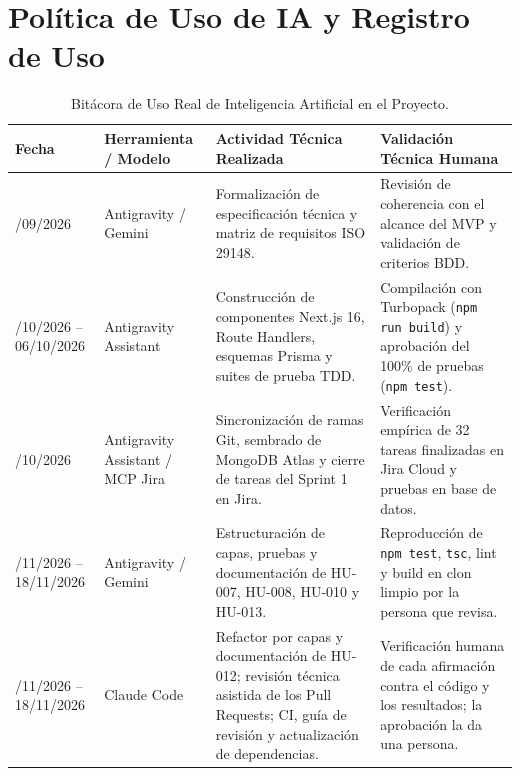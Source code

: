 \documentclass[11pt,a4paper]{article}
\begin{document}
\section{Política de Uso de IA y Registro de Uso}
\begin{table}[H]
\centering
\scriptsize
\renewcommand{\arraystretch}{1.2}
\begin{tabularx}{\linewidth}{|>{\raggedright\arraybackslash}p{2.2cm}|>{\raggedright\arraybackslash}p{3.0cm}|>{\raggedright\arraybackslash}p{4.5cm}|>{\raggedright\arraybackslash}X|}
\hline
\rowcolor{gray!15}
\textbf{Fecha} & \textbf{Herramienta / Modelo} & \textbf{Actividad Técnica Realizada} & \textbf{Validación Técnica Humana} \\
\hline
30/09/2026 & Antigravity / Gemini & Formalización de especificación técnica y matriz de requisitos ISO 29148. & Revisión de coherencia con el alcance del MVP y validación de criterios BDD. \\
\hline
01/10/2026 -- 06/10/2026 & Antigravity Assistant & Construcción de componentes Next.js 16, Route Handlers, esquemas Prisma y suites de prueba TDD. & Compilación con Turbopack (\texttt{npm run build}) y aprobación del 100\% de pruebas (\texttt{npm test}). \\
\hline
07/10/2026 & Antigravity Assistant / MCP Jira & Sincronización de ramas Git, sembrado de MongoDB Atlas y cierre de tareas del Sprint 1 en Jira. & Verificación empírica de 32 tareas finalizadas en Jira Cloud y pruebas en base de datos. \\
\hline
16/11/2026 -- 18/11/2026 & Antigravity / Gemini & Estructuración de capas, pruebas y documentación de HU-007, HU-008, HU-010 y HU-013. & Reproducción de \texttt{npm test}, \texttt{tsc}, lint y build en clon limpio por la persona que revisa. \\
\hline
17/11/2026 -- 18/11/2026 & Claude Code & Refactor por capas y documentación de HU-012; revisión técnica asistida de los Pull Requests; CI, guía de revisión y actualización de dependencias. & Verificación humana de cada afirmación contra el código y los resultados; la aprobación la da una persona. \\
\hline
\end{tabularx}
\caption{Bitácora de Uso Real de Inteligencia Artificial en el Proyecto.}
\end{table}
\end{document}
